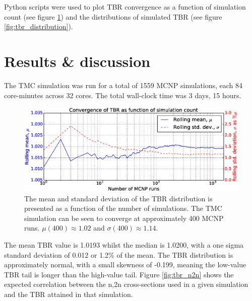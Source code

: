 Python scripts were used to plot TBR convergence as a function of simulation count (see figure \ref{fig:convergence}) and the distributions of simulated TBR (see figure \ref{fig:tbr_distribution}).

\section{Results \& discussion}

The TMC simulation was run for a total of 1559 MCNP simulations, each 84 core-minutes across 32 cores. The total wall-clock time was 3 days, 15 hours.

\begin{figure}[ht]
	\includegraphics[width=\textwidth]{hcll_convergence_1559}
	\caption{The mean and standard deviation of the TBR distribution is presented as a function of the number of simulations. The TMC simulation can be seen to converge at approximately 400 MCNP runs. $\mu(400) \approx 1.02$ and $\sigma(400) \approx 1.14$.}
	\label{fig:convergence}
\end{figure}

The mean TBR value is 1.0193 whilst the median is 1.0200, with a one sigma standard deviation of 0.012 or 1.2\% of the mean. The TBR distribution is approximately normal, with a small skewness of -0.199, meaning the low-value TBR tail is longer than the high-value tail. Figure \ref{fig:tbr_n2n} shows the expected correlation between the n,2n cross-sections used in a given simulation and the TBR attained in that simulation.

